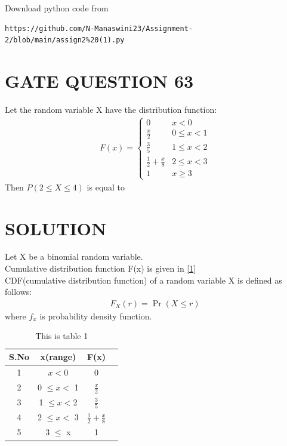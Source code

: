 \documentclass[journal,12pt,twocolumn]{IEEEtran}
\begin{document}
\renewcommand{\thefigure}{\theenumi}
\renewcommand{\thetable}{\theenumi}
Download python code from 
\begin{lstlisting}
https://github.com/N-Manaswini23/Assignment-2/blob/main/assign2%20(1).py
\end{lstlisting}
%

\section*{GATE QUESTION 63}
Let the random variable X have the distribution function:
\begin{align}
F(x) = \begin{cases}
0 & x < 0
\\
\frac{x}{2} & 0 \leq x < 1 
\\
\frac{3}{5} & 1 \leq x < 2
\\
\frac{1}{2}+\frac{x}{8} & 2 \leq x < 3
\\
1 & x \geq 3
\end{cases} \label{1}
\end{align}
Then $P (2 \leq X \leq 4)$ is equal to


\section*{SOLUTION}
Let X be a binomial random variable. \\
Cumulative distribution function F(x) is given in \eqref{1}\\
CDF(cumulative distribution function) of a random variable X is defined as follows:\\
\begin{align}
F_X(r) = \Pr (X \leq r) 
\end{align}
where $f_x$ is probability density function.
\begin{table}[h!]
\resizebox{7cm}{!}
{ 
\begin{tabular}{|c|c|c|c|}
\hline
S.No & x(range) & F(x) \\
\hline
1 & $x < 0$ & 0 \\
\hline
2 & 0 $\leq x < $ 1 & $\frac{x}{2}$\\
\hline
3 & 1 $\leq  x < $2 & $\frac{3}{5}$\\
\hline
4 & 2 $\leq x  < $ 3 & $\frac{1}{2}+\frac{x}{8}$  \\
\hline
5 & 3 $\leq$ x & 1\\
\hline
\end{tabular} 
}
\caption{This is table 1}
\label{table:1}
\end{table}
\end{document}
